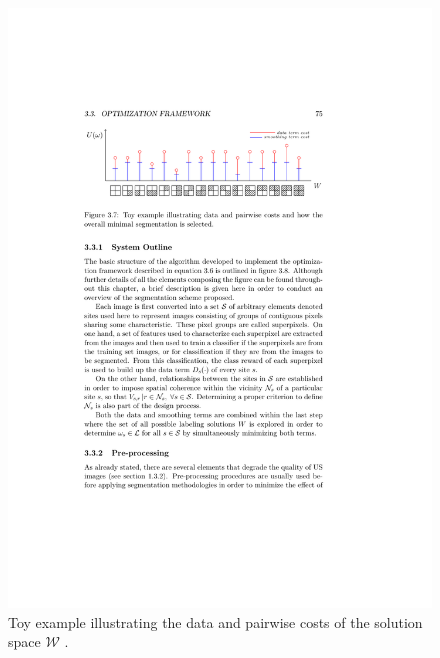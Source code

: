 \begin{frame}
\begin{figure}[htbp]
\begin{scriptsize}
\includegraphics[height=.4\textheight]{toy.pdf}
\end{scriptsize}
\caption{ Toy example illustrating the data and pairwise costs of the solution space $\mathcal{W}$ .}
\label{fig:toyFigure}
\end{figure}

%
\end{frame}

